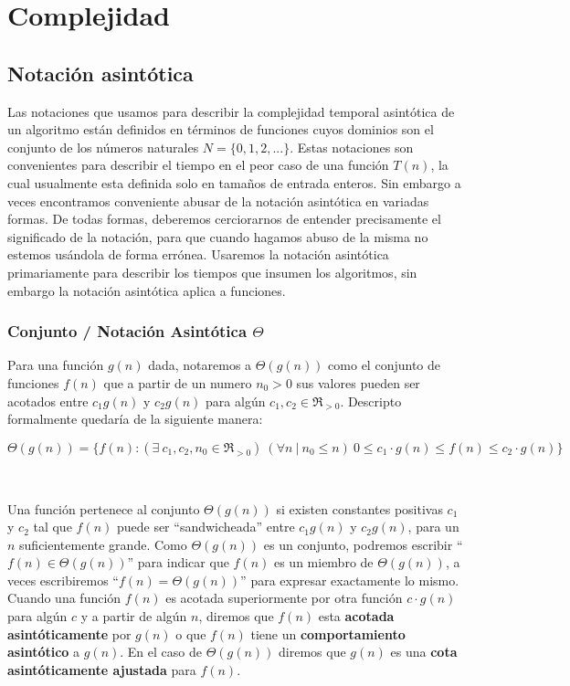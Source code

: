 \chapter{Complejidad}

\section{Notaci\'on asint\'otica}

Las notaciones que usamos para describir la complejidad temporal asint\'otica de un algoritmo est\'an definidos en t\'erminos de funciones cuyos dominios son el conjunto de los n\'umeros naturales $N = \{0,1,2,...\}$. Estas notaciones son convenientes para describir el tiempo en el peor caso de una funci\'on $T(n)$, la cual usualmente esta definida solo en tama\~nos de entrada enteros. Sin embargo a veces encontramos conveniente abusar de la notaci\'on asint\'otica en variadas formas. De todas formas, deberemos cerciorarnos de entender precisamente el significado de la notaci\'on, para que cuando hagamos abuso de la misma no estemos us\'andola de forma err\'onea. Usaremos la notaci\'on asint\'otica primariamente para describir los tiempos que insumen los algoritmos, sin embargo la notaci\'on asint\'otica aplica a funciones.

\subsection{Conjunto / Notaci\'on Asint\'otica $\Theta$}

Para una funci\'on $g(n)$ dada, notaremos a $\Theta(g(n))$ como el conjunto de funciones $f(n)$ que a partir de un numero $n_0 > 0$ sus valores pueden ser acotados entre $c_1g(n)$ y $c_2g(n)$ para alg\'un $c_1, c_2 \in \Re_{>0}$. Descripto formalmente quedar\'ia de la siguiente manera:

\begin{equation*}
 \Theta(g(n)) = \{ f(n) : (\exists\ c_1, c_2, n_0 \in \Re_{>0}) \ (\forall n\ |\ n_0 \leq n)\ 0 \leq c_1 \cdot g(n) \leq f(n) \leq c_2 \cdot g(n) \}
\end{equation*}

~

Una funci\'on pertenece al conjunto $\Theta(g(n))$ si existen constantes positivas $c_1$ y $c_2$ tal que $f(n)$ puede ser ``sandwicheada'' entre $c_1g(n)$ y $c_2g(n)$, para un $n$ suficientemente grande. Como $\Theta(g(n))$ es un conjunto, podremos escribir ``$f(n) \in \Theta(g(n))$'' para indicar que $f(n)$ es un miembro de $\Theta(g(n))$, a veces escribiremos ``$f(n) = \Theta(g(n))$'' para expresar exactamente lo mismo. Cuando una funci\'on $f(n)$ es acotada superiormente por otra funci\'on $c \cdot g(n)$ para alg\'un $c$ y a partir de alg\'un $n$, diremos que $f(n)$ esta \textbf{acotada asint\'oticamente} por $g(n)$ o que $f(n)$ tiene un \textbf{comportamiento asint\'otico} a $g(n)$. En el caso de $\Theta(g(n))$ diremos que $g(n)$ es una \textbf{cota asint\'oticamente ajustada} para $f(n)$.


